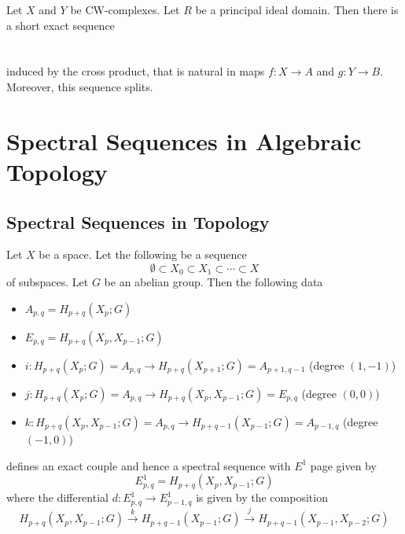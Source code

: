 \documentclass[a4paper]{article}
\begin{document}
\begin{prp}{}{} Let $X$ and $Y$ be CW-complexes. Let $R$ be a principal ideal domain. Then there is a short exact sequence \\~\\
\\
induced by the cross product, that is natural in maps $f:X\to A$ and $g:Y\to B$. Moreover, this sequence splits. 
\end{prp}

\pagebreak
\section{Spectral Sequences in Algebraic Topology}
\subsection{Spectral Sequences in Topology}
\begin{thm}{}{} Let $X$ be a space. Let the following be a sequence $$\emptyset\subset X_0\subset X_1\subset\cdots\subset X$$ of subspaces. Let $G$ be an abelian group. Then the following data
\begin{itemize}
\item $A_{p,q}=H_{p+q}(X_p;G)$
\item $E_{p,q}=H_{p+q}(X_p,X_{p-1};G)$
\item $i:H_{p+q}(X_p;G)=A_{p,q}\to H_{p+q}(X_{p+1};G)=A_{p+1,q-1}$ (degree $(1,-1)$)
\item $j:H_{p+q}(X_p;G)=A_{p,q}\to H_{p+q}(X_p,X_{p-1};G)=E_{p,q}$ (degree $(0,0)$)
\item $k:H_{p+q}(X_p,X_{p-1};G)=A_{p,q}\to H_{p+q-1}(X_{p-1};G)=A_{p-1,q}$ (degree $(-1,0)$)
\end{itemize}
defines an exact couple and hence a spectral sequence with $E^1$ page given by $$E_{p,q}^1=H_{p+q}(X_p,X_{p-1};G)$$ where the differential $d:E_{p,q}^1\to E_{p-1,q}^1$ is given by the composition $$H_{p+q}(X_p,X_{p-1};G)\overset{k}{\longrightarrow}H_{p+q-1}(X_{p-1};G)\overset{j}{\longrightarrow} H_{p+q-1}(X_{p-1},X_{p-2};G)$$
\end{thm}
\end{document}
